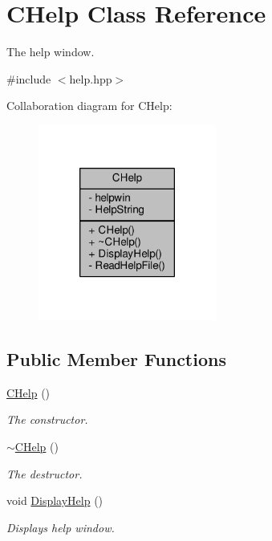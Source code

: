 \hypertarget{class_c_help}{\section{C\-Help Class Reference}
\label{class_c_help}
}


The help window.  




{\ttfamily \#include $<$help.\-hpp$>$}



Collaboration diagram for C\-Help\-:
\nopagebreak
\begin{figure}[H]
\begin{center}
\leavevmode
\includegraphics[width=166pt]{class_c_help__coll__graph}
\end{center}
\end{figure}
\subsection*{Public Member Functions}
\begin{DoxyCompactItemize}
\item 
\hyperlink{class_c_help_afde74ec5f76090baa26f50fc1a3a4a15}{C\-Help} ()
\begin{DoxyCompactList}\small\item\em The constructor. \end{DoxyCompactList}\item 
\hyperlink{class_c_help_ad3c627f6eaf41e7bc30d50a0f40aa0ad}{$\sim$\-C\-Help} ()
\begin{DoxyCompactList}\small\item\em The destructor. \end{DoxyCompactList}\item 
void \hyperlink{class_c_help_a48a3f3fdd8587ebd0732cfa31c27bf47}{Display\-Help} ()
\begin{DoxyCompactList}\small\item\em Displays help window. \end{DoxyCompactList}\end{DoxyCompactItemize}
